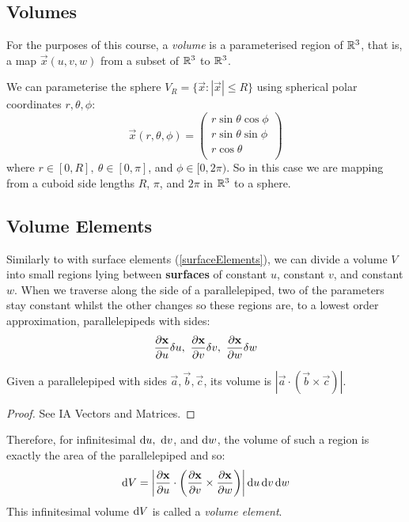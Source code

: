 \documentclass[../main.tex]{subfiles}
\begin{document}
\subsection{Volumes}
\begin{definition}[Volume]
  For the purposes of this course, a \textit{volume} is a parameterised region of $\mathbb{R}^3$, that is, a map $\vec{x}(u, v, w)$ from a subset of $\mathbb{R}^3$ to $\mathbb{R}^3$.
\end{definition}
\begin{example}
  We can parameterise the sphere $V_R = \{\vec{x}: |\vec{x}| \leq R\}$ using spherical polar coordinates $r, \theta, \phi$:
  \[
    \vec{x}(r, \theta, \phi) = \begin{pmatrix}
    r\sin\theta\cos\phi \\
    r\sin\theta\sin\phi \\
    r\cos\theta \\
    \end{pmatrix}
  \]
  where $r \in [0, R],\ \theta \in [0, \pi]$, and $\phi \in [0, 2\pi)$.
  So in this case we are mapping from a cuboid side lengths $R$, $\pi$, and $2\pi$ in $\mathbb{R}^3$ to a sphere.
\end{example}
\subsection{Volume Elements}
\label{volumeElements}
Similarly to with surface elements (\cref{surfaceElements}), we can divide a volume $V$ into small regions lying between \textbf{surfaces} of constant $u$, constant $v$, and constant $w$.
When we traverse along the side of a parallelepiped, two of the parameters stay constant whilst the other changes so these regions are, to a lowest order approximation, parallelepipeds with sides:
\[
  \pderiv{\vec{x}}{u}\delta u,\ \pderiv{\vec{x}}{v}\delta v,\ \pderiv{\vec{x}}{w}\delta w
\]
\begin{lemma}
  Given a parallelepiped with sides $\vec{a}, \vec{b}, \vec{c}$, its volume is $|\vec{a} \cdot (\vec{b} \times \vec{c})|$.
\end{lemma}
\begin{proof}
  See IA Vectors and Matrices.
\end{proof}
Therefore, for infinitesimal $\d{u},\ \d{v}$, and $\d{w}$, the volume of such a region is exactly the area of the parallelepiped and so:
\[
  \d{V} = \abs{\pderiv{\vec{x}}{u} \cdot \left(\pderiv{\vec{x}}{v} \times \pderiv{\vec{x}}{w}\right)} \d{u}\d{v}\d{w}
\]
This infinitesimal volume $\d{V}$ is called a \textit{volume element}.
\end{document}
